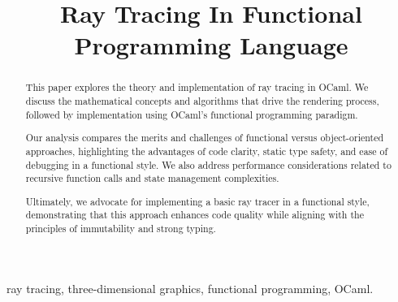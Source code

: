 \documentclass[conference]{IEEEtran}
\begin{document}
\title{Ray Tracing In Functional Programming Language}

\author{
\and
{}
\and
{}
}

\maketitle

\begin{abstract}
  This paper explores the theory and implementation of ray tracing in OCaml. We discuss the mathematical concepts and algorithms that drive the rendering process, followed by implementation using OCaml's functional programming paradigm.

  Our analysis compares the merits and challenges of functional versus object-oriented approaches, highlighting the advantages of code clarity, static type safety, and ease of debugging in a functional style. We also address performance considerations related to recursive function calls and state management complexities.
  
  Ultimately, we advocate for implementing a basic ray tracer in a functional style, demonstrating that this approach enhances code quality while aligning with the principles of immutability and strong typing. 
\end{abstract}

\begin{IEEEkeywords}
ray tracing, three-dimensional graphics, functional programming, OCaml.
\end{IEEEkeywords}
\end{document}
